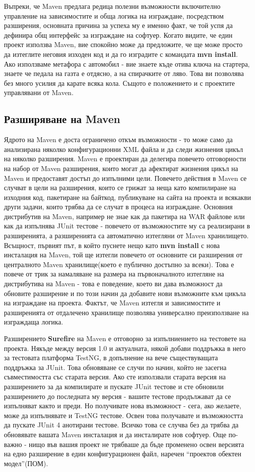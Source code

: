 Въпреки, че Maven предлага редица полезни възможности включително
управление на зависимостите и обща логика на изграждане, посредством
разширения, основната причина за успеха му е именно факт, че той успя
да дефинира общ интерфейс за изграждане на софтуер. Когато видите, че
един проект използва Maven, вие спокойно може да предложите, че ще
може просто да изтеглите неговия изходен код и да го изградите с
командата \textbf{mvn install}. Ако използваме метафора с автомобил -
вие знаете къде отива ключа на стартера, знаете че педала на газта е
отдясно, а на спирачките от ляво. Това ви позволява без много усилия
да карате всяка кола. Същото е положението и с проектите управлявани
от Maven.
\subsection{Разширяване на Maven}
Ядрото на Maven е доста ограничено откъм възможности - то може само да
анализирана няколко конфигурационни XML файла и да следи жизнения
цикъл на няколко разширения. Maven е проектиран да делегира повечето
отговорности на набор от Maven разширения, които могат да афектират
жизнения цикъл на Maven и предоставят достъп до изпълними
цели. Повечето действия в Maven се случват в цели на разширения, които
се грижат за неща като компилиране на изходния код, пакетиране на
байткод, публикуване на сайта на проекта и всякакви други задачи,
които трябва да се случат в процеса на изграждане. Основния
дистрибутив на Maven, например не знае как да пакетира на WAR файлове
или как да изпълнява JUnit тестове - повечето от възможностите му са
реализирани в разширенията, а разширенията са автоматично изтегляни от
Maven хранилището. Всъщност, първият път, в който пуснете нещо като
\textbf{mvn install} с нова инсталация на Maven, той ще изтегли
повечето от основните си разширения от централното Maven
хранилище(което е публично достъпно за всеки). Това е повече от трик
за намаляване на размера на първоначалното изтегляне на дистрибутива
на Maven - това е поведение, което ви дава възможност да обновите
разширение и по този начин да добавите нови възможните към цикъла на
изграждане на проекта. Фактът, че Maven изтегля и зависимостите и
разширенията от отдалечено хранилище позволява универсално
преизползване на изграждаща логика.

Разширението \textbf{Surefire} на Maven е отговорно за изпълниението
на тестовете на проекта. Някъде между версия 1.0 и актуалната, някой
добави поддръжка в него за тестовата платформа TestNG, в допълнение на
вече съществуващата поддръжка за JUnit. Това обновяване се случи по
начин, който не засегна съвместимостта със старата версия. Ако сте
използвали старата версия на разширението за да компилирате и пускате
JUnit тестове и сте обновили разширението до последната му версия -
вашите тестове продължават да се изпълняват както и преди. Но
получивате нова възможност - сега, ако желаете, може да изпълнявате и
TestNG тестове. Освен това получавате и възможността да пускате JUnit
4 анотирани тестове. Всичко това се случва без да трябва да обновявате
вашата Maven инсталация и да инсталирате нов софтуер. Още по-важно -
нищо във вашия проект не трябваше да бъде променено освен версията на
едно разширение в един конфигурационен файл, наречен "`проектов
обектен модел"'(ПОМ).

